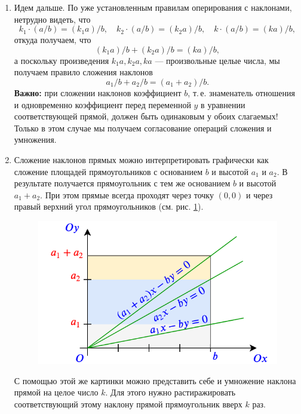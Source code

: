 \begin{enumerate}
\item Идем дальше. По уже установленным правилам оперирования с наклонами, нетрудно видеть, что
$$
k_1\cdot(a/b) = (k_1a)/b,\quad k_2\cdot(a/b) = (k_2a)/b,\quad k\cdot(a/b) = (ka)/b,
$$
откуда получаем, что
$$
(k_1a)/b + (k_2a)/b = (ka)/b,
$$
а поскольку произведения $k_1a, k_2a, ka$ --- произвольные целые числа, мы получаем правило сложения наклонов
$$
a_1/b + a_2/b = (a_1+a_2)/b.
$$
\textbf{Важно:} при сложении наклонов коэффициент $b$, т.\,е. знаменатель отношения и одновременно коэффициент перед переменной $y$ в уравнении соответствующей прямой, должен быть одинаковым у обоих слагаемых!
Только в этом случае мы получаем согласование операций сложения и умножения.

\item Сложение наклонов прямых можно интерпретировать графически как сложение площадей прямоугольников с основанием $b$ и высотой $a_1$ и $a_2$. В результате получается прямоугольник с тем же основанием $b$ и высотой $a_1+a_2$. При этом прямые всегда проходят через точку $(0,0)$ и через правый верхний угол прямоугольников (см. рис. \ref{linesum}).
\begin{figure}
\begin{center}
\includegraphics[scale=0.5]{linesum.png}
\end{center}
\caption{}\label{linesum}
\end{figure}
С помощью этой же картинки можно представить себе и умножение наклона прямой на целое число $k$. Для этого нужно растиражировать соответствующий этому наклону прямой прямоугольник вверх $k$ раз.


\end{enumerate}
